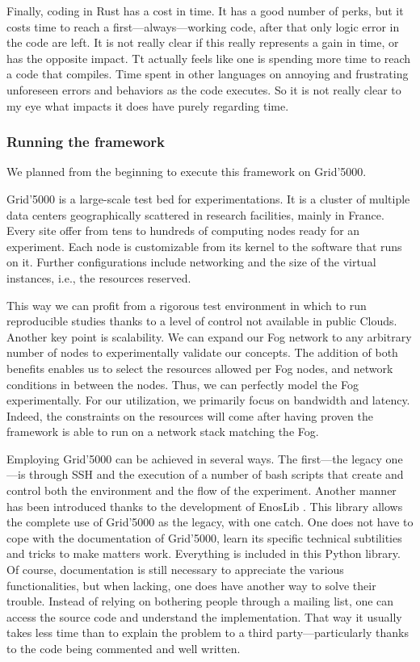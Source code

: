 Finally, coding in Rust has a cost in time. It has a good number of perks, but it costs time to reach a first—always—working code, after that only logic error in the code are left. It is not really clear if this really represents a gain in time, or has the opposite impact. Tt actually feels like one is spending more time to reach a code that compiles. Time spent in other languages on annoying and frustrating unforeseen errors and behaviors as the code executes. So it is not really clear to my eye what impacts it does have purely regarding time.

\subsubsection{Running the framework}

We planned from the beginning to execute this framework on Grid'5000.

Grid'5000 is a large-scale test bed for experimentations. It is a cluster of multiple data centers geographically scattered in research facilities, mainly in France. Every site offer from tens to hundreds of computing nodes ready for an experiment. Each node is customizable from its kernel to the software that runs on it. Further configurations include networking and the size of the virtual instances, i.e., the resources reserved.

This way we can profit from a rigorous test environment in which to run reproducible studies thanks to a level of control not available in public Clouds. Another key point is scalability. We can expand our Fog network to any arbitrary number of nodes to experimentally validate our concepts. The addition of both benefits enables us to select the resources allowed per Fog nodes, and network conditions in between the nodes. Thus, we can perfectly model the Fog experimentally. For our utilization, we primarily focus on bandwidth and latency. Indeed, the constraints on the resources will come after having proven the framework is able to run on a network stack matching the Fog.

Employing Grid'5000 can be achieved in several ways. The first—the legacy one—is through SSH and the execution of a number of bash scripts that create and control both the environment and the flow of the experiment.
Another manner has been introduced thanks to the development of EnosLib \cite{cherrueau_enoslib_2022}. This library allows the complete use of Grid'5000 as the legacy, with one catch. One does not have to cope with the documentation of Grid'5000, learn its specific technical subtilities and tricks to make matters work. Everything is included in this Python library. Of course, documentation is still necessary to appreciate the various functionalities, but when lacking, one does have another way to solve their trouble. Instead of relying on bothering people through a mailing list, one can access the source code and understand the implementation. That way it usually takes less time than to explain the problem to a third party—particularly thanks to the code being commented and well written.

